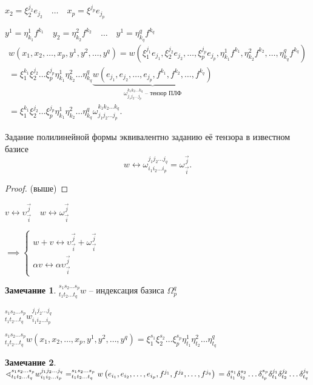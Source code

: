 \documentclass{book}
\theoremstyle{definition}
\newtheorem*{note}{Замечание}
\begin{document}
    $x_2 = \xi_2^{j_2}e_{j_2}\quad \ldots \quad x_p = \xi^{j_p}e_{j_p}$

    $y^1 = \eta_{k_1}^1f^{k_1}\quad y_2 = \eta_{k_2}^2f^{k_2}\quad \ldots \quad y^1 = \eta_{k_q}^qf^{k_q}$ 
    \begin{align*}        
    w\left( x_1, x_2, \ldots, x_p, y^1, y^2, \ldots, y^q \right) = w\left( \xi_1^{j_1}e_{j_1}, \xi_2^{j_2}e_{j_2}, \ldots, \xi_p^{j_p}e_{j_p}, \eta_{k_1}^1f^{k_1}, \eta^2_{k_2}f^{k_2}, \ldots, \eta_{k_q}^qf^{k_q} \right) \\
    = \xi_1^{k_1}\xi_2^{j_2}\ldots\xi_p^{j_p}\eta_{k_1}^1\eta_{k_2}^2\ldots\eta_{k_q}^q \underbrace{w\left( e_{j_1}, e_{j_2}, \ldots, e_{j_p}, f^{k_1}, f^{k_2}, \ldots, f^{k_q} \right) }\limits_{\omega_{j_1j_2 \ldots j_p}^{k_1 k_2 \ldots k_q} \text{ -- тензор ПЛФ}}
    \\ = \xi_1^{k_1}\xi_2^{j_2}\ldots\xi_p^{j_p}\eta_{k_1}^1\eta_{k_2}^2\ldots\eta_{k_q}^q \omega_{j_1 j_2 \ldots j_p} ^{k_1 k_2 ... k_q}
    .\end{align*}

    \begin{lemma}
        Задание полилинейной формы эквивалентно заданию её тензора в известном базисе
        \[
            w \longleftrightarrow \omega_{i_1 i_2 \ldots i_p} ^{j_1 j_2 \ldots j_q} = \omega^{\vec j}_{\vec i}
        .\] 
    \end{lemma}
    \begin{proof}
        (выше)
    \end{proof}

    \begin{lemma}
        $v \longleftrightarrow \upsilon_{\vec i}^{\vec j}\quad w \longleftrightarrow \omega_{\vec i}^{\vec j}$

        $\implies \begin{cases}
            w+v \longleftrightarrow \upsilon_{\vec i}^{\vec j} + \omega_{\vec i}^{\vec j}\\
            \alpha v \longleftrightarrow \alpha \upsilon_{\vec i}^{\vec j}
        \end{cases}$
    \end{lemma}

     \begin{note}
         $_{t_1 t_2 \ldots t_q}^{s_1 s_2 \ldots s_p}w$ -- индексация базиса $\Omega_p^q$

     $_{t_1 t_2 \ldots t_q}^{s_1 s_2 \ldots s_p}w_{i_1 i_2 \ldots i_p}^{j_1 j_2 \ldots j_q}$

     $_{t_1 t_2 \ldots t_q}^{s_1 s_2 \ldots s_p}w\left( x_1, x_2, \ldots, x_p, y^1, y^2, \ldots, y^q \right) = \xi_1^{s_1}\xi_2^{s_2}\ldots\xi_p^{s_p}\eta_{t_1}^1\eta^2_{t_2}\ldots\eta_{t_q}^q$
    \end{note}
    \begin{note}
        $\sphericalangle _{t_1 t_2 \ldots t_q}^{s_1 s_2 \ldots s_p}w_{i_1 i_2 \ldots i_p}^{j_1 j_2 \ldots j_q} = _{t_1 t_2 \ldots t_q}^{s_1 s_2 \ldots s_p}w\left( e_{i_1}, e_{i_2}, \ldots, e_{i_p}, f^{j_1}, f^{j_2}, \ldots, f^{j_q} \right) \\
        =\delta_{i_1}^{s_1}\delta_{i_2}^{s_2}\ldots\delta_{i_p}^{s_p}\delta_{t_1}^{j_1}\delta_{t_2}^{j_2}\ldots\delta_{t_q}^{j_q}$
    \end{note}
\end{document}
